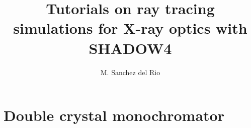 \documentclass{ol-softwaremanual}
\title{Tutorials on ray tracing simulations for X-ray optics with SHADOW4}
\author{M. Sanchez del Rio}
\begin{document}
\maketitle

\tableofcontents



\newpage
\section{Double crystal monochromator}


\end{document}
